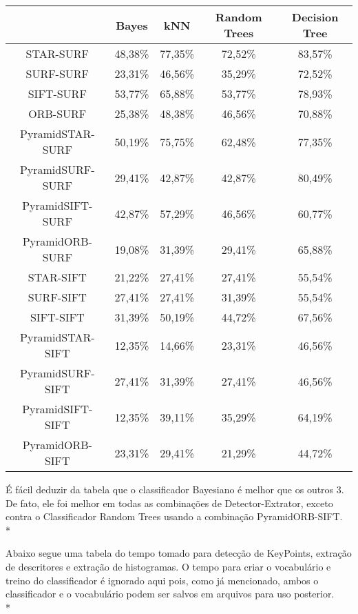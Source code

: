 \documentclass[a4paper,11pt]{article}
\begin{document}
\begin{tabular}{|c|c|c|c|c|}
    \hline
     & Bayes & kNN & Random Trees & Decision Tree \\
    \hline
        STAR-SURF & 48,38\% & 77,35\% & 72,52\% & 83,57\% \\
        SURF-SURF & 23,31\% & 46,56\% & 35,29\% & 72,52\% \\
        SIFT-SURF & 53,77\% & 65,88\% & 53,77\% & 78,93\%\\
        ORB-SURF & 25,38\% & 48,38\% & 46,56\% & 70,88\% \\
        PyramidSTAR-SURF & 50,19\% & 75,75\% & 62,48\% & 77,35\% \\
        PyramidSURF-SURF & 29,41\% & 42,87\% & 42,87\% & 80,49\% \\
        PyramidSIFT-SURF & 42,87\% & 57,29\% & 46,56\% & 60,77\% \\
        PyramidORB-SURF & 19,08\% & 31,39\% & 29,41\% & 65,88\% \\
        STAR-SIFT & 21,22\% & 27,41\% & 27,41\% & 55,54\% \\
        SURF-SIFT & 27,41\% & 27,41\% & 31,39\% & 55,54\% \\
        SIFT-SIFT & 31,39\% & 50,19\% & 44,72\% & 67,56\% \\
        PyramidSTAR-SIFT & 12,35\% & 14,66\% & 23,31\% & 46,56\% \\
        PyramidSURF-SIFT & 27,41\% & 31,39\% & 27,41\% & 46,56\% \\
        PyramidSIFT-SIFT & 12,35\% & 39,11\% & 35,29\% & 64,19\% \\
        PyramidORB-SIFT & 23,31\% & 29,41\% & 21,29\% & 44,72\% \\
        
    \hline
\end{tabular}
\bigskip

É fácil deduzir da tabela que o classificador Bayesiano é melhor que os outros 3. De fato, ele foi melhor em todas as combinações de Detector-Extrator, exceto contra o Classificador Random Trees usando a combinação PyramidORB-SIFT.\\*

Abaixo segue uma tabela do tempo tomado para detecção de KeyPoints, extração de descritores e extração de histogramas. O tempo para criar o vocabulário e treino do classificador é ignorado aqui pois, como já mencionado, ambos o classificador e o vocabulário podem ser salvos em arquivos para uso posterior.\\*
\end{document}
